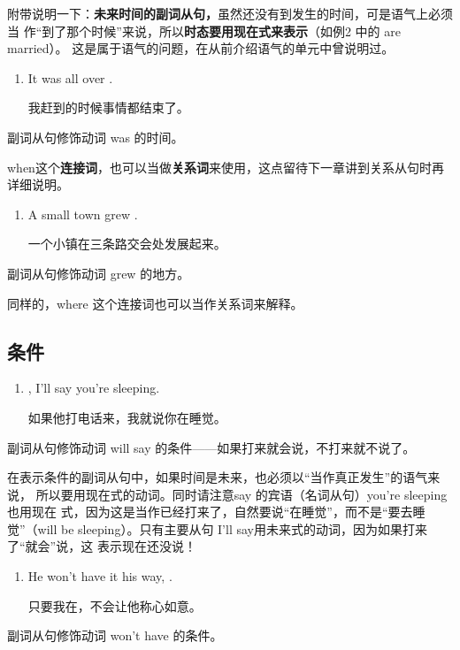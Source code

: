 附带说明一下：\textbf{未来时间的副词从句，}虽然还没有到发生的时间，可是语气上必须当
作“到了那个时候”来说，所以\textbf{时态要用现在式来表示}（如例2 中的 are married）。
这是属于语气的问题，在从前介绍语气的单元中曾说明过。

\begin{enumerate}[resume]
\item It was all over  .

  我赶到的时候事情都结束了。
\end{enumerate}
副词从句修饰动词 was 的时间。

when这个\textbf{连接词}，也可以当做\textbf{关系词}来使用，这点留待下一章讲到关系从句时再
详细说明。

\begin{enumerate}[resume]
\item A small town grew  .

  一个小镇在三条路交会处发展起来。
\end{enumerate}
副词从句修饰动词 grew 的地方。

同样的，where 这个连接词也可以当作关系词来解释。

\subsection{条件}

\begin{enumerate}
\item {} , I'll say you're
  sleeping.

  如果他打电话来，我就说你在睡觉。
\end{enumerate}
副词从句修饰动词 will say 的条件——如果打来就会说，不打来就不说了。

在表示条件的副词从句中，如果时间是未来，也必须以“当作真正发生”的语气来说，
所以要用现在式的动词。同时请注意say 的宾语（名词从句）you're sleeping也用现在
式，因为这是当作已经打来了，自然要说“在睡觉”，而不是“要去睡觉”（will be
sleeping）。只有主要从句 I'll say用未来式的动词，因为如果打来了“就会”说，这
表示现在还没说！

\begin{enumerate}[resume]
\item He won't have it his way,  .

  只要我在，不会让他称心如意。
\end{enumerate}
副词从句修饰动词 won't have 的条件。

